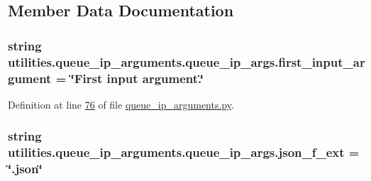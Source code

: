 \subsection{Member Data Documentation}
\hypertarget{classutilities_1_1queue__ip__arguments_1_1queue__ip__args_a14394c9820086e09d5b926d9910a180f}{}
\subsubsection[{first\+\_\+input\+\_\+argument}]{\setlength{\rightskip}{0pt plus 5cm}string utilities.\+queue\+\_\+ip\+\_\+arguments.\+queue\+\_\+ip\+\_\+args.\+first\+\_\+input\+\_\+argument = \char`\"{}First input argument.\char`\"{}\hspace{0.3cm}{\ttfamily [static]}}\label{classutilities_1_1queue__ip__arguments_1_1queue__ip__args_a14394c9820086e09d5b926d9910a180f}


Definition at line \hyperlink{queue__ip__arguments_8py_source_l00076}{76} of file \hyperlink{queue__ip__arguments_8py_source}{queue\+\_\+ip\+\_\+arguments.\+py}.

\hypertarget{classutilities_1_1queue__ip__arguments_1_1queue__ip__args_a8d93f9ade7608583602a9948c0d744f7}{}
\subsubsection[{json\+\_\+f\+\_\+ext}]{\setlength{\rightskip}{0pt plus 5cm}string utilities.\+queue\+\_\+ip\+\_\+arguments.\+queue\+\_\+ip\+\_\+args.\+json\+\_\+f\+\_\+ext = \char`\"{}.json\char`\"{}\hspace{0.3cm}{\ttfamily [static]}}\label{classutilities_1_1queue__ip__arguments_1_1queue__ip__args_a8d93f9ade7608583602a9948c0d744f7}


